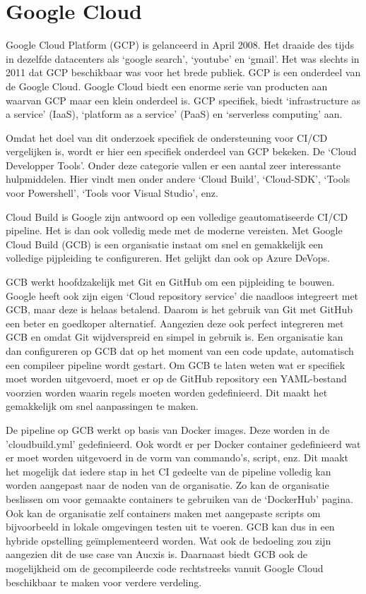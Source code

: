 \section{Google Cloud}
\label{sec:googlecloud}
Google Cloud Platform (GCP) is gelanceerd in April 2008. Het draaide des tijds in dezelfde datacenters als ‘google search’, ‘youtube’ en ‘gmail’. Het was slechts in 2011 dat GCP beschikbaar was voor het brede publiek. GCP is een onderdeel van de Google Cloud. Google Cloud biedt een enorme serie van producten aan waarvan GCP maar een klein onderdeel is. GCP specifiek, biedt ‘infrastructure as a service’ (IaaS), ‘platform as a service’ (PaaS) en ‘serverless computing’ aan. 

Omdat het doel van dit onderzoek specifiek de ondersteuning voor CI/CD vergelijken is, wordt er hier een specifiek onderdeel van GCP bekeken. De ‘Cloud Developper Tools’. Onder deze categorie vallen er een aantal zeer interessante hulpmiddelen. Hier vindt men onder andere ‘Cloud Build’, ‘Cloud-SDK’, ‘Tools voor Powershell’, ‘Tools voor Visual Studio’, enz.

Cloud Build is Google zijn antwoord op een volledige geautomatiseerde CI/CD pipeline. Het is dan ook volledig mede met de moderne vereisten. Met Google Cloud Build (GCB) is een organisatie instaat om snel en gemakkelijk een volledige pijpleiding te configureren. Het gelijkt dan ook op Azure DeVops.

GCB werkt hoofdzakelijk met Git en GitHub om een pijpleiding te bouwen. Google heeft ook zijn eigen ‘Cloud repository service’ die naadloos integreert met GCB, maar deze is helaas betalend. Daarom is het gebruik van Git met GitHub een beter en goedkoper alternatief. Aangezien deze ook perfect integreren met GCB en omdat Git wijdverspreid en simpel in gebruik is. Een organisatie kan dan configureren op GCB dat op het moment van een code update, automatisch een compileer pipeline wordt gestart. Om GCB te laten weten wat er specifiek moet worden uitgevoerd, moet er op de GitHub repository een YAML-bestand voorzien worden waarin regels moeten worden gedefinieerd. Dit maakt het gemakkelijk om snel aanpassingen te maken.

De pipeline op GCB werkt op basis van Docker images. Deze worden in de 'cloudbuild.yml' gedefinieerd. Ook wordt er per Docker container gedefinieerd wat er moet worden uitgevoerd in de vorm van commando’s, script, enz. Dit maakt het mogelijk dat iedere stap in het CI gedeelte van de pipeline volledig kan worden aangepast naar de noden van de organisatie. Zo kan de organisatie beslissen om voor gemaakte containers te gebruiken van de ‘DockerHub’ pagina. Ook kan de organisatie zelf containers maken met aangepaste scripts om bijvoorbeeld in lokale omgevingen testen uit te voeren. GCB kan dus in een hybride opstelling geïmplementeerd worden. Wat ook de bedoeling zou zijn aangezien dit de use case van Aucxis is. Daarnaast biedt GCB ook de mogelijkheid om de gecompileerde code rechtstreeks vanuit Google Cloud beschikbaar te maken voor verdere verdeling.

